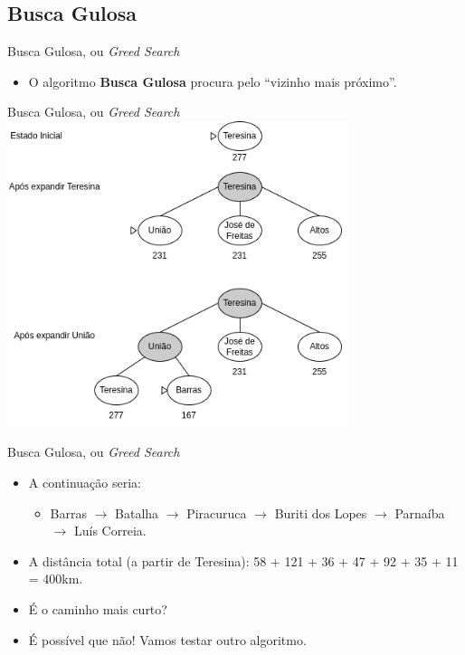\documentclass{libs/ufc_format}
\begin{document}
\subsection{Busca Gulosa}

\begin{frame}{Busca Gulosa, ou \textit{Greed Search}}
    \begin{itemize}
        \justifying
        \item O algoritmo \textbf{Busca Gulosa} procura pelo ``vizinho mais próximo''.
    \end{itemize}
\end{frame}

\begin{frame}{Busca Gulosa, ou \textit{Greed Search}}
    \centering
    \includegraphics[width=0.75\textwidth]{figuras/guloso}
\end{frame}

\begin{frame}{Busca Gulosa, ou \textit{Greed Search}}
    \begin{itemize}
        \justifying
        \item A continuação seria:
            \begin{itemize}
                \justifying
                \item Barras $\rightarrow$ Batalha $\rightarrow$ Piracuruca $\rightarrow$ Buriti dos Lopes $\rightarrow$ Parnaíba $\rightarrow$ Luís Correia.
            \end{itemize}
        \item A distância total (a partir de Teresina): 58 + 121 + 36 + 47 + 92 + 35 + 11 = 400km.
        \item<2-> É o caminho mais curto?
        \item<3-> É possível que não! Vamos testar outro algoritmo.
    \end{itemize}
\end{frame}
\end{document}
